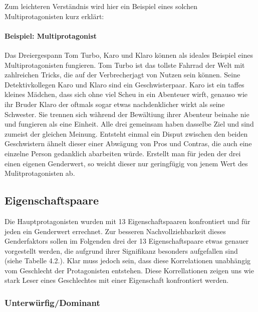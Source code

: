 

Zum leichteren Verständnis wird hier ein Beispiel eines solchen
Multiprotagonisten kurz erklärt:

\paragraph{Beispiel: Multiprotagonist}

Das Dreiergespann Tom Turbo, Karo und Klaro können als ideales Beispiel
eines Multiprotagonisten fungieren. Tom Turbo ist das tollste Fahrrad
der Welt mit zahlreichen Tricks, die auf der Verbrecherjagt von Nutzen
sein können. Seine Detektivkollegen Karo und Klaro sind ein
Geschwisterpaar. Karo ist ein taffes kleines Mädchen, dass sich ohne
viel Scheu in ein Abenteuer wirft, genauso wie ihr Bruder Klaro der
oftmals sogar etwas nachdenklicher wirkt als seine Schwester. Sie
trennen sich während der Bewältiung ihrer Abenteur beinahe nie und
fungieren als eine Einheit. Alle drei gemeinsam haben dasselbe Ziel und
sind zumeist der gleichen Meinung. Entsteht einmal ein Disput zwischen
den beiden Geschwistern ähnelt dieser einer Abwägung von Pros und
Contras, die auch eine einzelne Person gedanklich abarbeiten würde.
\parencite{Leope2008} Erstellt man für jeden der drei einen eigenen
Genderwert, so weicht dieser nur geringfügig von jenem Wert des
Mulitprotagonisten ab.

\subsection{Eigenschaftspaare}

Die Hauptprotagonisten wurden mit 13 Eigenschaftspaaren konfrontiert und
für jeden ein Genderwert errechnet. Zur besseren Nachvollziehbarkeit
dieses Genderfaktors sollen im Folgenden drei der 13 Eigenschaftspaare
etwas genauer vorgestellt werden, die aufgrund ihrer Signifikanz
besonders aufgefallen sind (siehe Tabelle 4.2.). Klar muss jedoch sein,
dass diese Korrelationen unabhängig vom Geschlecht der Protagonisten
entstehen. Diese Korrellationen zeigen uns wie stark Leser eines
Geschlechtes mit einer Eigenschaft konfrontiert werden.



\subsubsection{Unterwürfig/Dominant}

